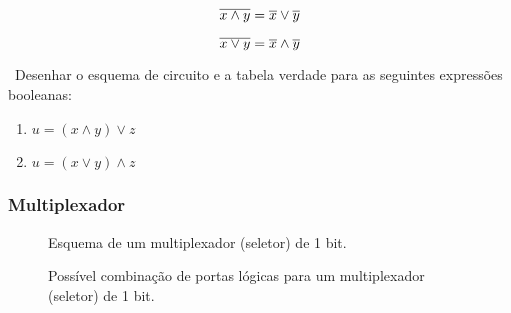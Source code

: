\begin{equation}
  \overline{x\land y} = \overline{x} \lor \overline{y}  
  \label{eq:morgan:and}
\end{equation}

\begin{equation}
\overline{x\lor y} = \overline{x} \land \overline{y}  
\label{eq:morgan:or}
\end{equation}

\exercise~Desenhar o esquema de circuito e a tabela verdade para as
seguintes expressões booleanas:

\begin{enumerate}
\item $u = (x \land y) \lor z$
\item $u = (x \lor y) \land z$
\end{enumerate}
  
\subsubsection{Multiplexador}
\begin{figure}[ht]
  \centering
  
  \label{fig:mux:symbol}
  \caption{Esquema de um multiplexador (seletor) de 1 bit.}
\end{figure}

\begin{figure}[ht]
  \centering
  
  \label{fig:mux:gate}
  \caption{Possível combinação de portas lógicas para um multiplexador
    (seletor) de 1 bit.}
\end{figure}





           
